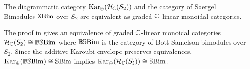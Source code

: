 \begin{theorem} \label{thm:one-col-sbim-equiv}
    The diagrammatic category $\operatorname{Kar_\oplus}(\mathcal{H}_{\mathbb{C}}(S_2))$ and the category of Soergel Bimodules $\operatorname{\mathbb{S}Bim}$ over $S_2$ are equivalent as graded  $\mathbb{C}$-linear monoidal categories.
\end{theorem}
The proof in \cite{elias-williamson-soergel-calculus} gives an equivalence of graded $\mathbb{C}$-linear monoidal categories $\mathcal{H}_{\mathbb{C}}(S_2) \cong \operatorname{\mathbb{BS}Bim}$ where $\operatorname{\mathbb{BS}Bim}$ is the category of Bott-Samelson bimodules over $S_2$. Since the additive Karoubi envelope preserves equivalences, $\operatorname{Kar_\oplus}(\operatorname{\mathbb{BS}Bim}) \cong \operatorname{\mathbb{S}Bim}$ implies $\operatorname{Kar_\oplus}(\mathcal{H}_{\mathbb{C}}(S_2)) \cong \operatorname{\mathbb{S}Bim}$.

